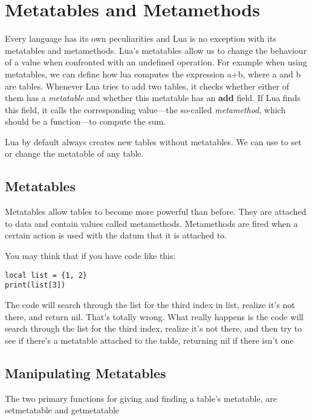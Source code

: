 \chapter{Metatables and Metamethods}

\def\textdblunderscore#1{{\bfseries \textunderscore\hskip1pt\textunderscore#1}}

Every language has its own peculiarities and Lua is no exception with its metatables and metamethods. Lua’s metatables allow us to change the behaviour of a value when confronted with an undefined operation. For example when using metatables, we can define how lua computes the expression a+b, where a and b are tables. Whenever Lua tries to add two tables, it checks whether either of them has a \emph{metatable} and whether this metatable has an \textdblunderscore{add} field. If Lua finds this field, it calls the corresponding value---the so-called \emph{metamethod}, which should be a function---to compute the sum.

Lua by default always creates new tables without metatables. We can use  to set or change the metatable of any table.

\section{Metatables}
Metatables allow tables to become more powerful than before. They are attached to data and contain values called metamethods. Metamethods are fired when a certain action is used with the datum that it is attached to.

You may think that if you have code like this:
\begin{verbatim}
local list = {1, 2}
print(list[3])
\end{verbatim}

The code will search through the list for the third index in list, realize it’s not there, and return nil. That’s totally wrong. What really happens is the code will search through the list for the third index, realize it’s not there, and then try to see if there’s a metatable attached to the table, returning nil if there isn’t one

\section{Manipulating Metatables}

The two primary functions for giving and finding a table’s metatable, are setmetatable and getmetatable

